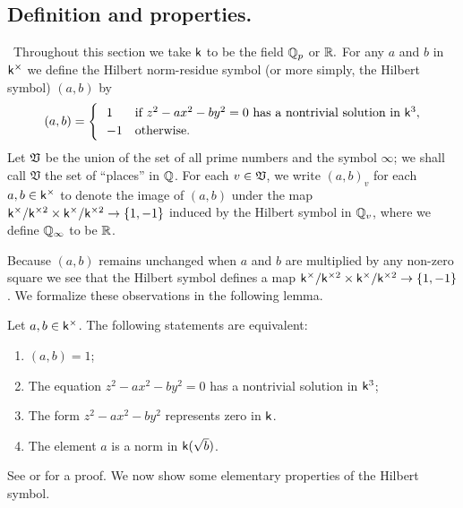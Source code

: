 \subsection{Definition and properties.}~Throughout this section we take \(\mathsf{k}\) to be the field \(\mathbb{Q}_p\) or \(\mathbb{R}.\) For any \(a\) and \(b\) in \(\mathsf{k}^{\times}\) we define the Hilbert norm-residue symbol (or more simply, the Hilbert symbol) \((a, b)\) by
\[
    (a, b) = \begin{cases}
        \ \ 1 & \text{if } z^2 - ax^2 - by^2 = 0 \text{ has a nontrivial solution in } \mathsf{k}^3, \\
        \ \ -1 & \text{otherwise}.
    \end{cases}
\]
\label{sec:hilbert-symbol-intro}
Let \(\mathfrak{V}\) be the union of the set of all prime numbers and the symbol \(\infty\); we shall call \(\mathfrak{V}\) the set of ``places'' in \(\mathbb{Q}\). For each \(v \in \mathfrak{V}\), we write \((a, b)_v\) for  each \(a, b \in \mathsf{k}^{\times}\) to denote the image of \((a, b)\) under the map \(\mathsf{k}^{\times}/\mathsf{k}^{\times2} \times \mathsf{k}^{\times}/\mathsf{k}^{\times2} \to \{1, -1\}\) induced by the Hilbert symbol in \(\mathbb{Q}_v\), where we define \(\mathbb{Q}_{\infty}\) to be \(\mathbb{R}\).

Because \((a, b)\) remains unchanged when \(a\) and \(b\) are multiplied by any non-zero square we see that the Hilbert symbol defines a map \(\mathsf{k}^{\times}/\mathsf{k}^{\times2} \times \mathsf{k}^{\times}/\mathsf{k}^{\times2} \to \{1, -1\}\). We formalize these observations in the following lemma.
\begin{lemma}
    Let \(a, b \in \mathsf{k}^{\times}\). The following statements are equivalent:

    \medskip

    \begin{enumerate}[nosep, label=(\alph*)]
        \item \((a, b) = 1\);
        \item The equation \(z^2 - ax^2 - by^2 = 0\) has a nontrivial solution in \(\mathsf{k}^3\);
        \item The form \(z^2 - ax^2 - by^2\) represents zero in \(\mathsf{k}\).
        \item The element \(a\) is a norm in \(\mathsf{k}(\sqrt{b})\).
    \end{enumerate}
\end{lemma}

See \cite[pp.~17--18]{serre2012course} or \cite[p.~1]{sutherland2013introduction} for a proof. We now show some elementary properties of the Hilbert symbol.

